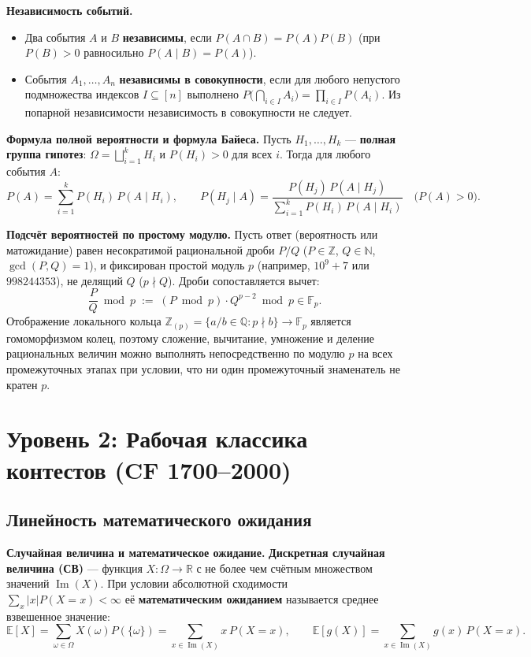 \documentclass[10pt,a4paper]{article}
\newcommand{\N}{\mathbb{N}}
\newcommand{\Z}{\mathbb{Z}}
\newcommand{\R}{\mathbb{R}}
\newcommand{\F}{\mathbb{F}}
\newcommand{\E}{\mathbb{E}}
\begin{document}
\textbf{Независимость событий.}
\begin{itemize}
  \item Два события $A$ и $B$ \textbf{независимы}, если $P(A \cap B) = P(A)P(B)$ (при $P(B) > 0$ равносильно $P(A \mid B) = P(A)$).
  \item События $A_1, \dots, A_n$ \textbf{независимы в совокупности}, если для любого непустого подмножества индексов $I \subseteq [n]$ выполнено $P\bigl(\bigcap_{i \in I} A_i\bigr) = \prod_{i \in I} P(A_i)$. Из попарной независимости независимость в совокупности не следует.
\end{itemize}

\textbf{Формула полной вероятности и формула Байеса.} Пусть $H_1, \dots, H_k$ — \textbf{полная группа гипотез}: $\Omega = \bigsqcup_{i=1}^k H_i$ и $P(H_i) > 0$ для всех $i$. Тогда для любого события $A$:
\[
  P(A) = \sum_{i=1}^{k} P(H_i)\, P(A \mid H_i), \qquad
  P(H_j \mid A) = \frac{P(H_j)\, P(A \mid H_j)}{\sum_{i=1}^{k} P(H_i)\, P(A \mid H_i)} \quad \bigl(P(A) > 0\bigr).
\]

\textbf{Подсчёт вероятностей по простому модулю.} Пусть ответ (вероятность или матожидание) равен несократимой рациональной дроби $P / Q$ ($P \in \Z$, $Q \in \N$, $\gcd(P, Q) = 1$), и фиксирован простой модуль $p$ (например, $10^9 + 7$ или $998244353$), не делящий $Q$ ($p \nmid Q$). Дроби сопоставляется вычет:
\[
  \frac{P}{Q} \bmod p \;:=\; (P \bmod p) \cdot Q^{p-2} \bmod p \in \F_p.
\]
Отображение локального кольца $\Z_{(p)} = \{a / b \in \mathbb{Q} : p \nmid b\} \to \F_p$ является гомоморфизмом колец, поэтому сложение, вычитание, умножение и деление рациональных величин можно выполнять непосредственно по модулю $p$ на всех промежуточных этапах при условии, что ни один промежуточный знаменатель не кратен $p$.

\section{Уровень 2: Рабочая классика контестов (CF 1700--2000)}

\subsection{Линейность математического ожидания}

\textbf{Случайная величина и математическое ожидание.} \textbf{Дискретная случайная величина (СВ)} — функция $X : \Omega \to \R$ с не более чем счётным множеством значений $\operatorname{Im}(X)$. При условии абсолютной сходимости $\sum_{x} |x| P(X = x) < \infty$ её \textbf{математическим ожиданием} называется среднее взвешенное значение:
\[
  \E[X] = \sum_{\omega \in \Omega} X(\omega) P(\{\omega\}) = \sum_{x \in \operatorname{Im}(X)} x \, P(X = x), \qquad
  \E[g(X)] = \sum_{x \in \operatorname{Im}(X)} g(x) \, P(X = x).
\]
\end{document}

